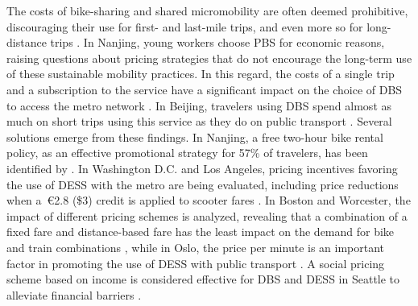 \begin{refsegment}
The costs of bike-sharing and shared micromobility are often deemed prohibitive, discouraging their use for first- and last-mile trips, and even more so for long-distance trips \textcolor{blue}{\autocite[5]{montes_shared_2023}}. In Nanjing, young workers choose \acrshort{PBS} for economic reasons, raising questions about pricing strategies that do not encourage the long-term use of these sustainable mobility practices. In this regard, the costs of a single trip and a subscription to the service have a significant impact on the choice of \acrshort{DBS} to access the metro network \textcolor{blue}{\autocite[17]{zhong_layout_2021}}. In Beijing, travelers using \acrshort{DBS} spend almost as much on short trips using this service as they do on public transport \textcolor{blue}{\autocite[12]{fan_how_2019}}. Several solutions emerge from these findings. In Nanjing, a free two-hour bike rental policy, as an effective promotional strategy for 57\% of travelers, has been identified by \textcolor{blue}{\textcite[135]{chen_determinants_2012}}. In Washington D.C. and Los Angeles, pricing incentives favoring the use of \acrshort{DESS} with the metro are being evaluated, including price reductions when a~\euro2.8 (\$3) credit is applied to scooter fares \textcolor{blue}{\autocite[11]{yan_evaluating_2023}}. In Boston and Worcester, the impact of different pricing schemes is analyzed, revealing that a combination of a fixed fare and distance-based fare has the least impact on the demand for bike and train combinations \textcolor{blue}{\autocite[16]{fournier_continuous_2021}}, while in Oslo, the price per minute is an important factor in promoting the use of \acrshort{DESS} with public transport \textcolor{blue}{\autocite[5]{fearnley_patterns_2020}}. A social pricing scheme based on income is considered effective for \acrshort{DBS} and \acrshort{DESS} in Seattle to alleviate financial barriers \textcolor{blue}{\autocite[975-977]{beale_integrating_2023}}.%


\end{refsegment}

